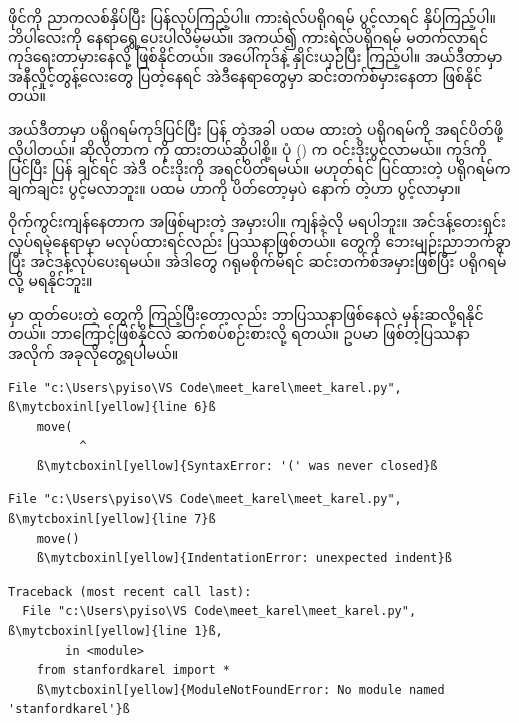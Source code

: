 ဖိုင်ကို ညာကလစ်နှိပ်ပြီး  ပြန်လုပ်ကြည့်ပါ။ ကားရဲလ်ပရိုဂရမ် ပွင့်လာရင်  နှိပ်ကြည့်ပါ။ ဘိပါလေးကို နေရာရွှေ့ပေးပါလိမ့်မယ်။ အကယ်၍ ကားရဲလ်ပရိုဂရမ် မတက်လာရင် ကုဒ်ရေးတာမှားနေလို့ ဖြစ်နိုင်တယ်။ အပေါ်ကုဒ်နဲ့ နှိုင်းယှဉ်ပြီး ကြည့်ပါ။  အယ်ဒီတာမှာ အနီလှိုင့်တွန့်လေးတွေ ပြတဲ့နေရင် အဲဒီနေရာတွေမှာ ဆင်းတက်စ်မှားနေတာ ဖြစ်နိုင်တယ်။
%
\begin{mytcbox}
 အယ်ဒီတာမှာ ပရိုဂရမ်ကုဒ်ပြင်ပြီး ပြန်  တဲ့အခါ ပထမ  ထားတဲ့ ပရိုဂရမ်ကို အရင်ပိတ်ဖို့လိုပါတယ်။ ဆိုလိုတာက  ကို  ထားတယ်ဆိုပါစို့။ ပုံ (\fRefNo{\ref{fig:mtkrlprgm}}) က ဝင်းဒိုးပွင့်လာမယ်။  ကုဒ်ကို ပြင်ပြီး ပြန်  ချင်ရင် အဲဒီ ဝင်းဒိုးကို အရင်ပိတ်ရမယ်။ မဟုတ်ရင် ပြင်ထားတဲ့ ပရိုဂရမ်က ချက်ချင်း ပွင့်မလာဘူး။ ပထမ ဟာကို ပိတ်တော့မှပဲ နောက်  တဲ့ဟာ ပွင့်လာမှာ။ 
\end{mytcbox}
%
ဝိုက်ကွင်းကျန်နေတာက အဖြစ်များတဲ့ အမှားပါ။ ကျန်ခဲ့လို မရပါဘူး။ အင်ဒန့်တေးရှင်း  လုပ်ရမဲ့နေရာမှာ မလုပ်ထားရင်လည်း ပြဿနာဖြစ်တယ်။ \fEn{,}  တွေကို ဘေးမျဉ်းညာဘက်ခွာပြီး အင်ဒန့်လုပ်ပေးရမယ်။ အဲဒါတွေ ဂရုမစိုက်မိရင် ဆင်းတက်စ်အမှားဖြစ်ပြီး ပရိုဂရမ်  လို့ မရနိုင်ဘူး။

 မှာ ထုတ်ပေးတဲ့ တွေကို ကြည့်ပြီးတော့လည်း ဘာပြဿနာဖြစ်နေလဲ မှန်းဆလို့ရနိုင်တယ်။ ဘာကြောင့်ဖြစ်နိုင်လဲ ဆက်စပ်စဉ်းစားလို့ ရတယ်။ ဥပမာ ဖြစ်တဲ့ပြဿနာအလိုက် အခုလိုတွေ့ရပါမယ်။ 
%
\begin{verbatim}
File "c:\Users\pyiso\VS Code\meet_karel\meet_karel.py", ß\mytcboxinl[yellow]{line 6}ß
    move(
          ^
    ß\mytcboxinl[yellow]{SyntaxError: '(' was never closed}ß
\end{verbatim}
%
%
\begin{verbatim}
File "c:\Users\pyiso\VS Code\meet_karel\meet_karel.py", ß\mytcboxinl[yellow]{line 7}ß
    move()
    ß\mytcboxinl[yellow]{IndentationError: unexpected indent}ß 
\end{verbatim}
%
%
\begin{verbatim}
Traceback (most recent call last):
  File "c:\Users\pyiso\VS Code\meet_karel\meet_karel.py", ß\mytcboxinl[yellow]{line 1}ß, 
        in <module>
    from stanfordkarel import *
    ß\mytcboxinl[yellow]{ModuleNotFoundError: No module named 'stanfordkarel'}ß
\end{verbatim}
%



